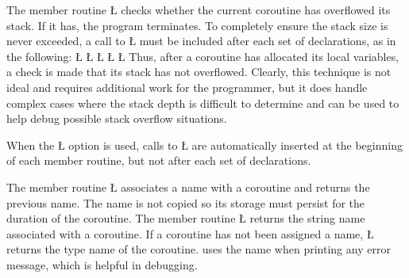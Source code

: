 \documentclass[openright,twoside]{report}
\begin{document}
The member routine \LGinlinetrue\LGbegin\lgrinde\L{}\endlgrinde\LGend{} checks whether the current coroutine has overflowed its stack.
If it has, the program terminates.
To completely ensure the stack size is never exceeded, a call to \LGinlinetrue\LGbegin\lgrinde\L{}\endlgrinde\LGend{} must be included after each set of declarations, as in the following:
\LGinlinefalse\LGbegin\lgrinde
\L{}
\L{\LB{}}
\CE{}\L{\LB{}}
\CE{}\L{\LB{}}
\CE{}\L{\LB{\}}}
\endlgrinde\LGend
Thus, after a coroutine has allocated its local variables, a check is made that its stack has not overflowed.
Clearly, this technique is not ideal and requires additional work for the programmer, but it does handle complex cases where the stack depth is difficult to determine and can be used to help debug possible stack overflow situations.

\begin{annotation}
When the \LGinlinetrue\LGbegin\lgrinde\L{}\endlgrinde\LGend{} option is used, calls to \LGinlinetrue\LGbegin\lgrinde\L{}\endlgrinde\LGend{} are automatically inserted at the beginning of each member routine, but not after each set of declarations.
\end{annotation}

The member routine \LGinlinetrue\LGbegin\lgrinde\L{}\endlgrinde\LGend{} associates a name with a coroutine and returns the previous name.
The name is not copied so its storage must persist for the duration of the coroutine.
The member routine \LGinlinetrue\LGbegin\lgrinde\L{}\endlgrinde\LGend{} returns the string name associated with a coroutine.
If a coroutine has not been assigned a name, \LGinlinetrue\LGbegin\lgrinde\L{}\endlgrinde\LGend{} returns the type name of the coroutine.
\uC uses the name when printing any error message, which is helpful in debugging.
\end{document}
